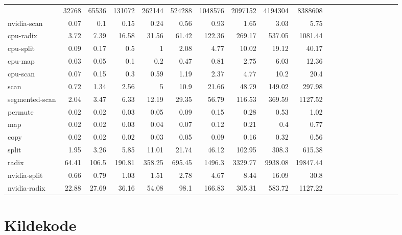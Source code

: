{\scriptsize
\begin{tabular}{lrrrrrrrrrrrrrrrrrrr}
&32768&65536&131072&262144&524288&1048576&2097152&4194304&8388608&\\
nvidia-scan&0.07&0.1&0.15&0.24&0.56&0.93&1.65&3.03&5.75&\\
cpu-radix&3.72&7.39&16.58&31.56&61.42&122.36&269.17&537.05&1081.44&\\
cpu-split&0.09&0.17&0.5&1&2.08&4.77&10.02&19.12&40.17&\\
cpu-map&0.03&0.05&0.1&0.2&0.47&0.81&2.75&6.03&12.36&\\
cpu-scan&0.07&0.15&0.3&0.59&1.19&2.37&4.77&10.2&20.4&\\
scan&0.72&1.34&2.56&5&10.9&21.66&48.79&149.02&297.98&\\
segmented-scan&2.04&3.47&6.33&12.19&29.35&56.79&116.53&369.59&1127.52&\\
permute&0.02&0.02&0.03&0.05&0.09&0.15&0.28&0.53&1.02&\\
map&0.02&0.02&0.03&0.04&0.07&0.12&0.21&0.4&0.77&\\
copy&0.02&0.02&0.02&0.03&0.05&0.09&0.16&0.32&0.56&\\
split&1.95&3.26&5.85&11.01&21.74&46.12&102.95&308.3&615.38&\\
radix&64.41&106.5&190.81&358.25&695.45&1496.3&3329.77&9938.08&19847.44&\\
nvidia-split&0.66&0.79&1.03&1.51&2.78&4.67&8.44&16.09&30.8&\\
nvidia-radix&22.88&27.69&36.16&54.08&98.1&166.83&305.31&583.72&1127.22&\\
\end{tabular}}

\section{Kildekode}

